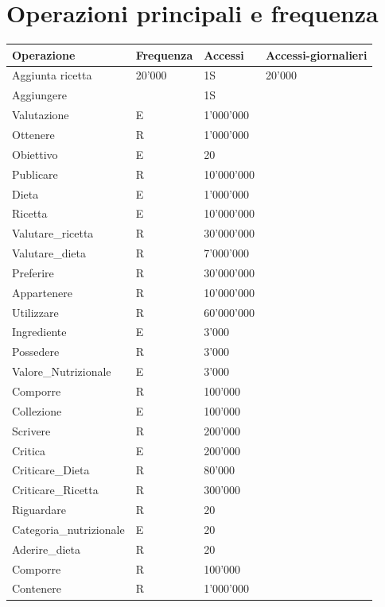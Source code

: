 ﻿\documentclass[a4paper,12pt]{report}
\begin{document}
\section{Operazioni principali e frequenza}
\begin{table}[H]
    \center
        \begin{tabular}{ |p{1.7in}|p{0.8in}|p{1.4in}|p{1.4in}| }
            \hline
            Operazione  & Frequenza  & Accessi & Accessi-giornalieri\\
            \hline
            Aggiunta ricetta   & 20'000   & 1S & 20'000 \\
            Aggiungere   &  & 1S   \\
            Valutazione   & E   & 1'000'000    \\
            Ottenere & R&  1'000'000 \\
            Obiettivo & E& 20\\
            Publicare & R& 10'000'000\\
            Dieta & E& 1'000'000\\
            Ricetta & E& 10'000'000 \\
            Valutare\_ricetta & R& 30'000'000\\
            Valutare\_dieta &R & 7'000'000\\
            Preferire & R& 30'000'000\\
            Appartenere & R& 10'000'000\\
            Utilizzare & R& 60'000'000\\
            Ingrediente & E& 3'000\\
            Possedere & R& 3'000\\
            Valore\_Nutrizionale & E& 3'000\\
            Comporre & R& 100'000\\
            Collezione & E& 100'000\\
            Scrivere & R& 200'000 \\
            Critica & E& 200'000\\
            Criticare\_Dieta & R& 80'000 \\
            Criticare\_Ricetta & R& 300'000\\
            Riguardare & R& 20\\
            Categoria\_nutrizionale & E&20 \\
            Aderire\_dieta & R& 20\\
            Comporre & R& 100'000\\
            Contenere & R& 1'000'000\\
            \hline
        \end{tabular}  
    \end{table}
\end{document}
